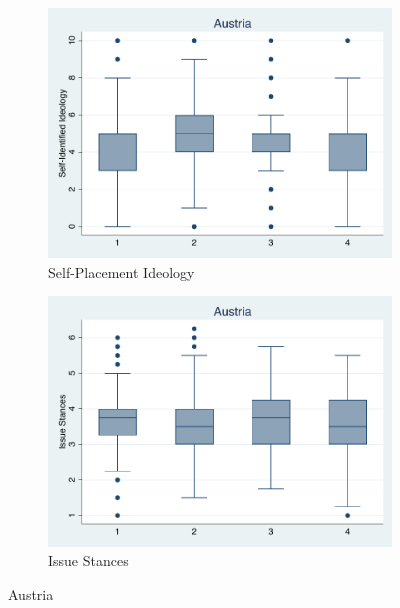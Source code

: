 \documentclass[12pt, titlepage]{article}
\begin{document}
\begin{figure}[H]
	\centering
	\begin{subfigure}[b]{0.475\textwidth}   
	\centering 
	\includegraphics[width=\textwidth]{IdeoBP/Austria}
	\caption{Self-Placement Ideology}
	\end{subfigure}
	\hfill
	\begin{subfigure}[b]{0.475\textwidth}
	\centering 
	\includegraphics[width=\textwidth]{BoxLib/Austria}
	\caption{Issue Stances}
	\end{subfigure}
	\caption{Austria}
	\label{Austria}
\end{figure}
\end{document}
